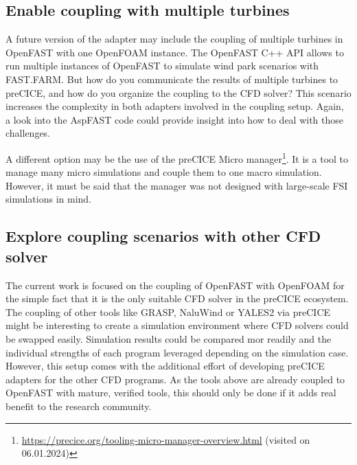 \subsection{Enable coupling with multiple turbines}

A future version of the adapter may include the coupling of multiple turbines in OpenFAST with one OpenFOAM instance. The OpenFAST C++ API allows to run multiple instances of OpenFAST to simulate wind park scenarios with FAST.FARM. But how do you communicate the results of multiple turbines to preCICE, and how do you organize the coupling to the CFD solver? This scenario increases the complexity in both adapters involved in the coupling setup. Again, a look into the AspFAST code could provide insight into how to deal with those challenges.

A different option may be the use of the preCICE Micro manager\footnote{\url{https://precice.org/tooling-micro-manager-overview.html} (visited on 06.01.2024)}. It is a tool to manage many micro simulations and couple them to one macro simulation. However, it must be said that the manager was not designed with large-scale FSI simulations in mind.
\begin{comment}
\begin{itemize}
	\item OpenFAST C++ API allows to run multiple instances of OpenFAST for wind park scenarios
	\item How do you connect them to preCICE? 
	\item How do you define the different coupling scenarios?
	\item Possibly use the MacroMicro manager of preCICE to deal with the coupling of multiple domains\\
\end{itemize}
\end{comment}


\subsection{Explore coupling scenarios with other CFD solver}

The current work is focused on the coupling of OpenFAST with OpenFOAM for the simple fact that it is the only suitable CFD solver in the preCICE ecosystem. The coupling of other tools like GRASP, NaluWind or YALES2 via preCICE might be interesting to create a simulation environment where CFD solvers could be swapped easily. Simulation results could be compared mor readily and the individual strengths of each program leveraged depending on the simulation case. However, this setup comes with the additional effort of developing preCICE adapters for the other CFD programs. As the tools above are already coupled to OpenFAST with mature, verified tools, this should only be done if it adds real benefit to the research community.

